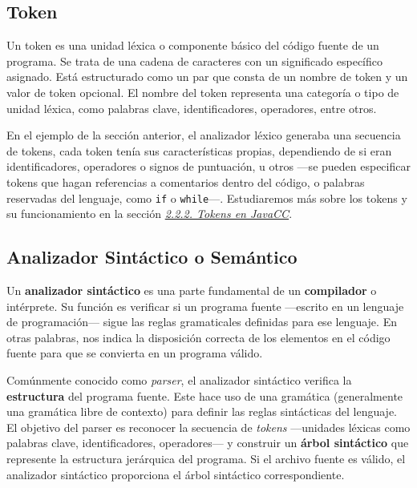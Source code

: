 \lstset{inputencoding=utf8/latin1}


\subsection{Token}
\noindent Un token es una unidad léxica o componente básico del código fuente de un programa. Se trata de una cadena de caracteres con un significado específico asignado. Está estructurado como un par que consta de un nombre de token y un valor de token opcional. El nombre del token representa una categoría o tipo de unidad léxica, como palabras clave, identificadores, operadores, entre otros\cite{token}.

En el ejemplo de la sección anterior, el analizador léxico generaba una secuencia de tokens, cada token tenía sus características propias, dependiendo de si eran identificadores, operadores o signos de puntuación, u otros ---se pueden especificar tokens que hagan referencias a comentarios dentro del código, o palabras reservadas del lenguaje, como \lstinline[keywordstyle=\color{black}]|if| o \lstinline[keywordstyle=\color{black}]|while|---. Estudiaremos más sobre los tokens y su funcionamiento en la sección \hyperref[sec:tokensenjavacc]{\textit{2.2.2. Tokens en JavaCC}}.


\subsection{Analizador Sintáctico o Semántico}
\noindent Un \textbf{analizador sintáctico} es una parte fundamental de un \textbf{compilador} o intérprete. Su función es verificar si un programa fuente ---escrito en un lenguaje de programación--- sigue las reglas gramaticales definidas para ese lenguaje\cite{analizadorsintactico}. En otras palabras, nos indica la disposición correcta de los elementos en el código fuente para que se convierta en un programa válido.

Comúnmente conocido como \textit{parser}, el analizador sintáctico verifica la \textbf{estructura} del programa fuente. Este hace uso de una gramática (generalmente una gramática libre de contexto) para definir las reglas sintácticas del lenguaje. El objetivo del parser es reconocer la secuencia de \textit{tokens} ---unidades léxicas como palabras clave, identificadores, operadores--- y construir un \textbf{árbol sintáctico} que represente la estructura jerárquica del programa. Si el archivo fuente es válido, el analizador sintáctico proporciona el árbol sintáctico correspondiente.

